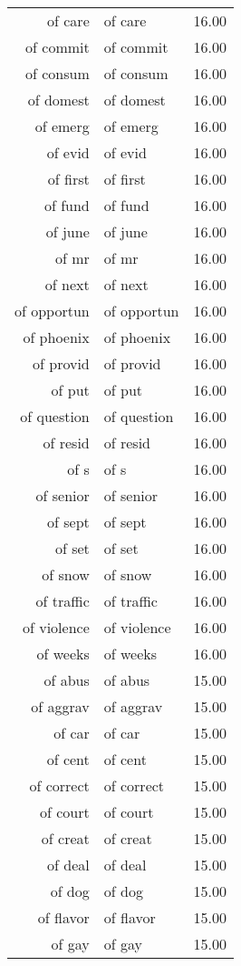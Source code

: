 \begin{table}[ht]
\begin{tabular}{rlr}
  of care & of care & 16.00 \\ 
  of commit & of commit & 16.00 \\ 
  of consum & of consum & 16.00 \\ 
  of domest & of domest & 16.00 \\ 
  of emerg & of emerg & 16.00 \\ 
  of evid & of evid & 16.00 \\ 
  of first & of first & 16.00 \\ 
  of fund & of fund & 16.00 \\ 
  of june & of june & 16.00 \\ 
  of mr & of mr & 16.00 \\ 
  of next & of next & 16.00 \\ 
  of opportun & of opportun & 16.00 \\ 
  of phoenix & of phoenix & 16.00 \\ 
  of provid & of provid & 16.00 \\ 
  of put & of put & 16.00 \\ 
  of question & of question & 16.00 \\ 
  of resid & of resid & 16.00 \\ 
  of s & of s & 16.00 \\ 
  of senior & of senior & 16.00 \\ 
  of sept & of sept & 16.00 \\ 
  of set & of set & 16.00 \\ 
  of snow & of snow & 16.00 \\ 
  of traffic & of traffic & 16.00 \\ 
  of violence & of violence & 16.00 \\ 
  of weeks & of weeks & 16.00 \\ 
  of abus & of abus & 15.00 \\ 
  of aggrav & of aggrav & 15.00 \\ 
  of car & of car & 15.00 \\ 
  of cent & of cent & 15.00 \\ 
  of correct & of correct & 15.00 \\ 
  of court & of court & 15.00 \\ 
  of creat & of creat & 15.00 \\ 
  of deal & of deal & 15.00 \\ 
  of dog & of dog & 15.00 \\ 
  of flavor & of flavor & 15.00 \\ 
  of gay & of gay & 15.00 \\ 

\end{tabular}
\end{table}
